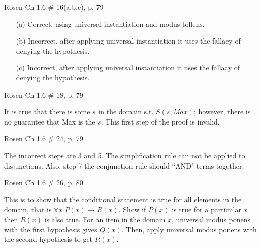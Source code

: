 \documentclass[12pt,addpoints]{exam}
\newcommand{\ra}{\rightarrow}
\begin{document}
\begin{questions}
\question Rosen Ch 1.6 \# 16(a,b,c), p. 79
    \ifprintanswers
        \vspace{-10pt}
    \fi
\begin{solution}
    \begin{itemize}[itemsep=0pt,parsep=0pt,topsep=0pt,partopsep=0pt]
        \item[(a)] Correct, using universal instantiation and modus tollens.
        \item[(b)] Incorrect, after applying universal instantiation it uses the fallacy of denying the hypothesis.
        \item[(c)] Incorrect, after applying universal instantiation it uses the fallacy of denying the hypothesis.
    \end{itemize}
\end{solution}


\question Rosen Ch 1.6 \# 18, p. 79
    \ifprintanswers
        \vspace{-10pt}
    \fi
\begin{solution}
    It is true that there is some $s$ in the domain s.t. $S(s,Max)$; however, there is no guarantee that Max is the $s$.  This first step of the proof is invalid.
\end{solution}


\question Rosen Ch 1.6 \# 24, p. 79
    \ifprintanswers
        \vspace{-10pt}
    \fi
\begin{solution}
    The incorrect steps are 3 and 5.  The simplification rule can not be applied to disjunctions.  Also, step 7 the conjunction rule should ``AND" terms together.
\end{solution}


\question Rosen Ch 1.6 \# 26, p. 80
    \ifprintanswers
        \vspace{-10pt}
    \fi
\begin{solution}
    This is to show that the conditional statement is true for all elements in the domain, that is $\forall x\; P(x) \ra R(x)$.  Show if $P(x)$ is true for a particular $x$ then $R(x)$ is also true.  For an item in the domain $x$, universal modus ponens with the first hypothesis gives $Q(x)$.  Then, apply universal modus ponens with the second hypothesis to get $R(x)$.
\end{solution}

    
\end{questions}
\end{document}
